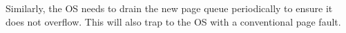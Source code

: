 Similarly, the OS needs to drain the new page queue periodically to ensure it
does not overflow. This will also trap to the OS with a conventional page
fault.

%
%
%
%

